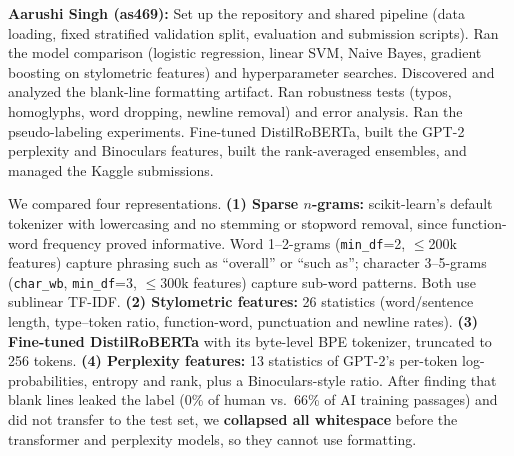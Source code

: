 
\textbf{Aarushi Singh (as469):} Set up the repository and shared pipeline (data
loading, fixed stratified validation split, evaluation and submission scripts).
Ran the model comparison (logistic regression, linear SVM, Naive Bayes, gradient
boosting on stylometric features) and hyperparameter searches. Discovered and
analyzed the blank-line formatting artifact. Ran robustness tests (typos,
homoglyphs, word dropping, newline removal) and error analysis. Ran the
pseudo-labeling experiments. Fine-tuned DistilRoBERTa, built the GPT-2 perplexity
and Binoculars features, built the rank-averaged ensembles, and managed the
Kaggle submissions.

We compared four representations. \textbf{(1) Sparse $n$-grams:} scikit-learn's
default tokenizer with lowercasing and no stemming or stopword removal, since
function-word frequency proved informative. Word 1--2-grams
(\texttt{min\_df}=2, $\le$200k features) capture phrasing such as ``overall'' or
``such as''; character 3--5-grams (\texttt{char\_wb}, \texttt{min\_df}=3,
$\le$300k features) capture sub-word patterns. Both use sublinear TF-IDF.
\textbf{(2) Stylometric features:} 26 statistics (word/sentence length,
type--token ratio, function-word, punctuation and newline rates).
\textbf{(3) Fine-tuned DistilRoBERTa} with its byte-level BPE tokenizer,
truncated to 256 tokens. \textbf{(4) Perplexity features:} 13 statistics of
GPT-2's per-token log-probabilities, entropy and rank, plus a Binoculars-style
ratio. After finding that blank lines leaked the label (0\% of human vs.\ 66\%
of AI training passages) and did not transfer to the test set, we
\textbf{collapsed all whitespace} before the transformer and perplexity models,
so they cannot use formatting.

